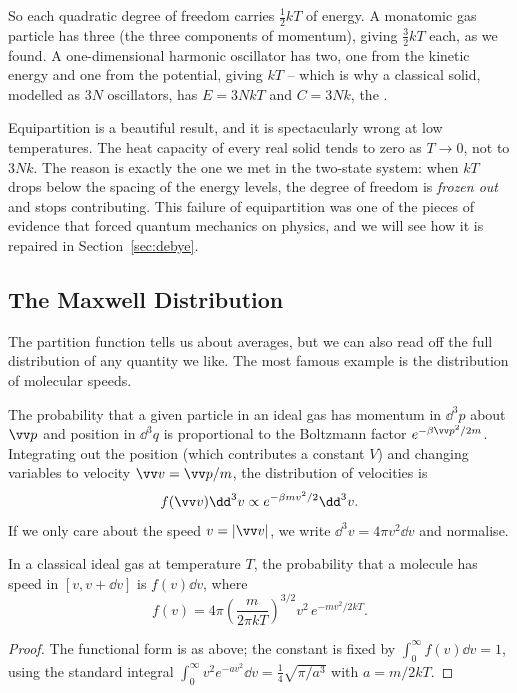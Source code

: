 So each quadratic degree of freedom carries $\tfrac 12 kT$ of energy. A monatomic gas particle has three (the three components of momentum), giving $\tfrac 32 kT$ each, as we found. A one-dimensional harmonic oscillator has two, one from the kinetic energy and one from the potential, giving $kT$ -- which is why a classical solid, modelled as $3N$ oscillators, has $E = 3NkT$ and $C = 3Nk$, the .

Equipartition is a beautiful result, and it is spectacularly wrong at low temperatures. The heat capacity of every real solid tends to zero as $T \to 0$, not to $3Nk$. The reason is exactly the one we met in the two-state system: when $kT$ drops below the spacing of the energy levels, the degree of freedom is \emph{frozen out} and stops contributing. This failure of equipartition was one of the pieces of evidence that forced quantum mechanics on physics, and we will see how it is repaired in Section~\ref{sec:debye}.

\subsection{The Maxwell Distribution}

The partition function tells us about averages, but we can also read off the full distribution of any quantity we like. The most famous example is the distribution of molecular speeds.

The probability that a given particle in an ideal gas has momentum in $\dd^3 p$ about $\vv p$ and position in $\dd^3 q$ is proportional to the Boltzmann factor $e^{-\beta \vv p^2/2m}$. Integrating out the position (which contributes a constant $V$) and changing variables to velocity $\vv v = \vv p/m$, the distribution of velocities is
$$
f(\vv v)\dd^3 v \propto e^{-\beta m v^2/2}\dd^3 v.
$$
If we only care about the speed $v = |\vv v|$, we write $\dd^3 v = 4\pi v^2 \dd v$ and normalise.

\begin{proposition}
	In a classical ideal gas at temperature $T$, the probability that a molecule has speed in $[v, v+\dd v]$ is $f(v)\dd v$, where
	$$
	f(v) = 4\pi\left(\frac{m}{2\pi kT}\right)^{3/2} v^2\, e^{-mv^2/2kT}.
	$$
\end{proposition}
\begin{proof}
	The functional form is as above; the constant is fixed by $\int_0^\infty f(v)\dd v = 1$, using the standard integral $\int_0^\infty v^2 e^{-av^2}\dd v = \tfrac 14\sqrt{\pi/a^3}$ with $a = m/2kT$.
\end{proof}

